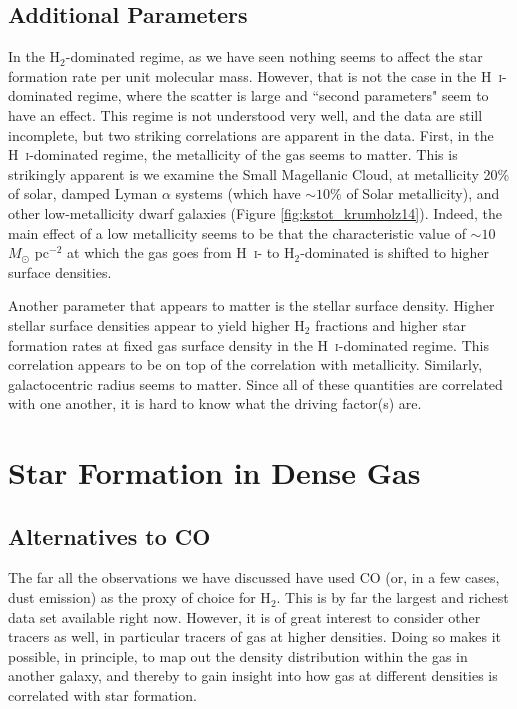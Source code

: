 \subsection{Additional Parameters}

In the H$_2$-dominated regime, as we have seen nothing seems to affect the star formation rate per unit molecular mass. However, that is not the case in the H~\textsc{i}-dominated regime, where the scatter is large and ``second parameters" seem to have an effect. This regime is not understood very well, and the data are still incomplete, but two striking correlations are apparent in the data. First, in the H~\textsc{i}-dominated regime, the metallicity of the gas seems to matter. This is strikingly apparent is we examine the Small Magellanic Cloud, at metallicity 20\% of solar, damped Lyman $\alpha$ systems (which have $\sim 10\%$ of Solar metallicity), and other low-metallicity dwarf galaxies (Figure \ref{fig:kstot_krumholz14}). Indeed, the main effect of a low metallicity seems to be that the characteristic value of $\sim 10$ $M_\odot$ pc$^{-2}$ at which the gas goes from H~\textsc{i}- to H$_2$-dominated is shifted to higher surface densities.

Another parameter that appears to matter is the stellar surface density. Higher stellar surface densities appear to yield higher H$_2$ fractions and higher star formation rates at fixed gas surface density in the H~\textsc{i}-dominated regime. This correlation appears to be on top of the correlation with metallicity. Similarly, galactocentric radius seems to matter. Since all of these quantities are correlated with one another, it is hard to know what the driving factor(s) are.

\section{Star Formation in Dense Gas}

\subsection{Alternatives to CO}

The far all the observations we have discussed have used CO (or, in a few cases, dust emission) as the proxy of choice for H$_2$. This is by far the largest and richest data set available right now. However, it is of great interest to consider other tracers as well, in particular tracers of gas at higher densities. Doing so makes it possible, in principle, to map out the density distribution within the gas in another galaxy, and thereby to gain insight into how gas at different densities is correlated with star formation.

